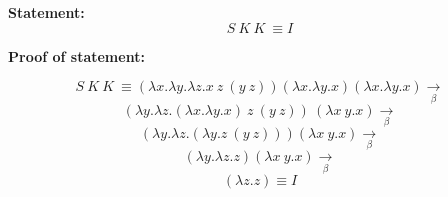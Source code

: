 \documentclass[12pt]{article}
\begin{document}
	\begin{flushleft}
		\textbf{ Statement:} $$ S\ K\ K\ \equiv I $$ 
	\end{flushleft} 
	\begin{flushleft}
		\textbf{ Proof of statement:}
	\end{flushleft} 
	$$S\ K\ K\ \equiv (\lambda x.\lambda y.\lambda z.x\ z\ (y\ z))(\lambda x.\lambda y.x)(\lambda x.\lambda y.x) \underset{\beta}{\to}$$
	$$(\lambda y.\lambda z.(\lambda x.\lambda y.x)\ z\ (y\ z))\ (\lambda x\ y.x) \underset{\beta}{\to}$$
	$$(\lambda y.\lambda z.(\lambda y.z\ (y\ z)))(\lambda x\ y.x)\underset{\beta}{\to}$$
    $$(\lambda y.\lambda z.z)(\lambda x\ y.x)\underset{\beta}{\to}$$
    $$(\lambda z.z) \equiv I $$
\end{document}

